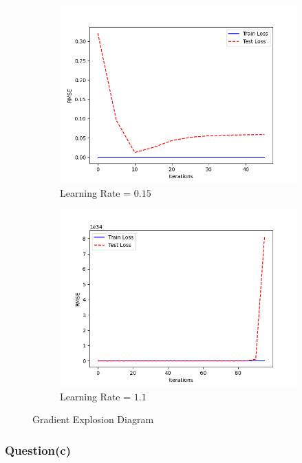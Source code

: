 \documentclass[a4paper, utf8]{ctexart}
\begin{document}
	\begin{figure}[htbp]
		\centering
		\begin{subfigure}{.48\textwidth}
			\centering
			\includegraphics[width=.9\linewidth]{./figure/1(b)1.png}
			\caption{Learning Rate = $0.15$}
		\end{subfigure}
		\begin{subfigure}{.48\textwidth}
			\centering
			\includegraphics[width=.9\linewidth]{./figure/1(b)7.png}
			\caption{Learning Rate = $1.1$}
		\end{subfigure}
		\caption{Gradient Explosion Diagram}
	\end{figure}
	
	\subsubsection{Question(c)}
	
\end{document}
